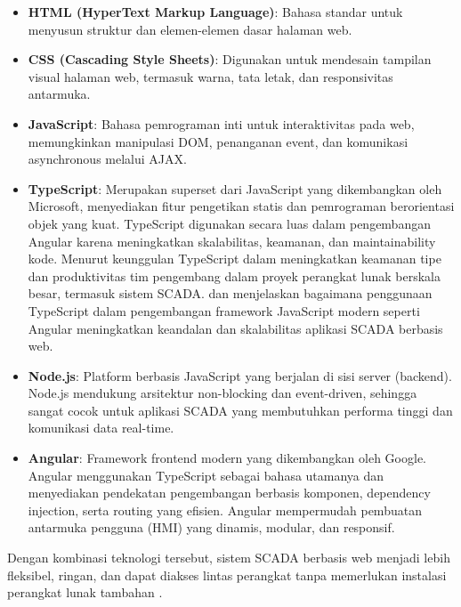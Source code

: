 \begin{itemize}
    \item \textbf{HTML (HyperText Markup Language)}: Bahasa standar untuk menyusun struktur dan elemen-elemen dasar halaman web.
    
    \item \textbf{CSS (Cascading Style Sheets)}: Digunakan untuk mendesain tampilan visual halaman web, termasuk warna, tata letak, dan responsivitas antarmuka.
    
    \item \textbf{JavaScript}: Bahasa pemrograman inti untuk interaktivitas pada web, memungkinkan manipulasi DOM, penanganan event, dan komunikasi asynchronous melalui AJAX.
    
    \item \textbf{TypeScript}: Merupakan superset dari JavaScript yang dikembangkan oleh Microsoft, menyediakan fitur pengetikan statis dan pemrograman berorientasi objek yang kuat. TypeScript digunakan secara luas dalam pengembangan Angular karena meningkatkan skalabilitas, keamanan, dan maintainability kode. Menurut \textcite{scarsbrook2023typescript} keunggulan TypeScript dalam meningkatkan keamanan tipe dan produktivitas tim pengembang dalam proyek perangkat lunak berskala besar, termasuk sistem SCADA. dan \textcite{emmanni2025typescript} menjelaskan bagaimana penggunaan TypeScript dalam pengembangan framework JavaScript modern seperti Angular meningkatkan keandalan dan skalabilitas aplikasi SCADA berbasis web.
    
    
    
    \item \textbf{Node.js}: Platform berbasis JavaScript yang berjalan di sisi server (backend). Node.js mendukung arsitektur non-blocking dan event-driven, sehingga sangat cocok untuk aplikasi SCADA yang membutuhkan performa tinggi dan komunikasi data real-time.
    
    \item \textbf{Angular}: Framework frontend modern yang dikembangkan oleh Google. Angular menggunakan TypeScript sebagai bahasa utamanya dan menyediakan pendekatan pengembangan berbasis komponen, dependency injection, serta routing yang efisien. Angular mempermudah pembuatan antarmuka pengguna (HMI) yang dinamis, modular, dan responsif.

\end{itemize}

Dengan kombinasi teknologi tersebut, sistem SCADA berbasis web menjadi lebih fleksibel, ringan, dan dapat diakses lintas perangkat tanpa memerlukan instalasi perangkat lunak tambahan \parencite{seeed2024fuxa}.

